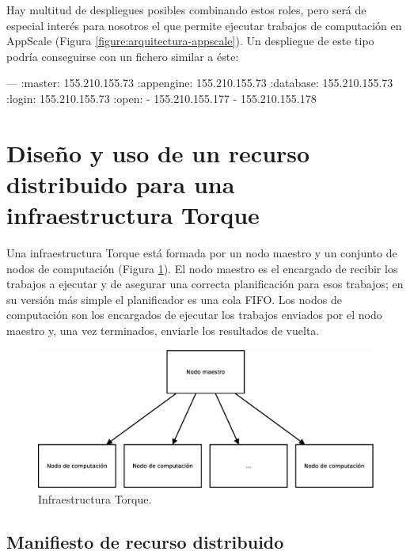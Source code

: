 Hay multitud de despliegues posibles combinando estos roles, pero será de especial interés para nosotros el que permite ejecutar trabajos de computación en AppScale (Figura \ref{figure:arquitectura-appscale}). Un despliegue de este tipo podría conseguirse con un fichero similar a éste:

\begin{yamlcode}
---
:master:    155.210.155.73
:appengine: 155.210.155.73
:database:  155.210.155.73
:login:     155.210.155.73
:open:
- 155.210.155.177
- 155.210.155.178
\end{yamlcode}


\section{Diseño y uso de un recurso distribuido para una infraestructura Torque}

Una infraestructura Torque está formada por un nodo maestro y un conjunto de nodos de computación (Figura \ref{figure:arquitectura-torque}). El nodo maestro es el encargado de recibir los trabajos a ejecutar y de asegurar una correcta planificación para esos trabajos; en su versión más simple el planificador es una cola FIFO. Los nodos de computación son los encargados de ejecutar los trabajos enviados por el nodo maestro y, una vez terminados, enviarle los resultados de vuelta.

\begin{figure} [!htbp]
  \centering
  \includegraphics[width=13.5cm]{figuras/Arquitectura_Torque.eps}
  \caption{Infraestructura Torque.}
\label{figure:arquitectura-torque}
\end{figure}

\subsection{Manifiesto de recurso distribuido}

